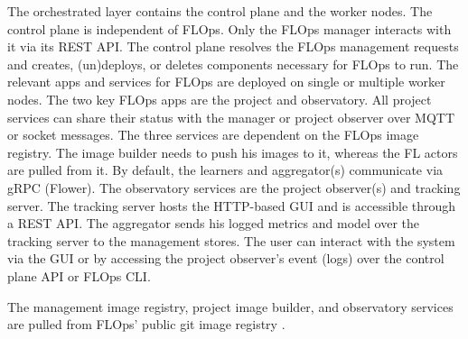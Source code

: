 The orchestrated layer contains the control plane and the worker nodes.
The control plane is independent of FLOps.
Only the FLOps manager interacts with it via its REST API.
The control plane resolves the FLOps management requests and creates, (un)deploys, or deletes components necessary for FLOps to run.
The relevant apps and services for FLOps are deployed on single or multiple worker nodes.
The two key FLOps apps are the project and observatory.
All project services can share their status with the manager or project observer over MQTT or socket messages.
The three services are dependent on the FLOps image registry.
The image builder needs to push his images to it, whereas the FL actors are pulled from it.
By default, the learners and aggregator(s) communicate via gRPC (Flower).
The observatory services are the project observer(s) and tracking server.
The tracking server hosts the HTTP-based GUI and is accessible through a REST API.
The aggregator sends his logged metrics and model over the tracking server to the management stores.
The user can interact with the system via the GUI or by accessing the project observer's event (logs) over the control plane API or FLOps CLI.

The management image registry, project image builder, and observatory services are pulled from FLOps' public git image registry \cite{flops_code}.